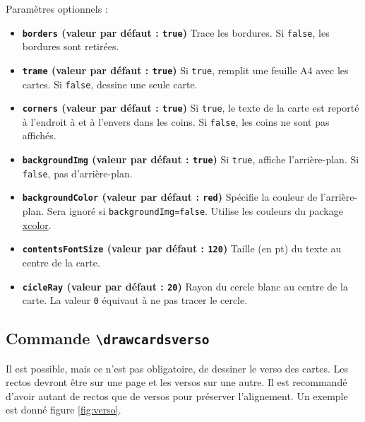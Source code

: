 \documentclass[a4paper, 12pt]{article}
\newcommand{\key}[3]{\textbf{\texttt{#1} (valeur par défaut : \texttt{#2})} #3}
\newcommand{\commande}[1]{\texttt{\textbackslash#1}}
\begin{document}
Paramètres optionnels :
\begin{itemize}
	\item \key{borders}{true}{Trace les bordures. Si \texttt{false}, les bordures sont retirées.}
	\item \key{trame}{true}{Si \texttt{true}, remplit une feuille A4 avec les cartes. Si \texttt{false}, dessine une seule carte.}
	\item \key{corners}{true}{Si \texttt{true}, le texte de la carte est reporté à l'endroit à et à l'envers dans les coins. Si \texttt{false}, les coins ne sont pas affichés.}
	\item \key{backgroundImg}{true}{Si \texttt{true}, affiche l'arrière-plan. Si \texttt{false}, pas d'arrière-plan.}
	\item \key{backgroundColor}{red}{Spécifie la couleur de l'arrière-plan. Sera ignoré si \texttt{backgroundImg=false}. Utilise les couleurs du package \href{https://www.ctan.org/pkg/xcolor}{xcolor}.}
	\item \key{contentsFontSize}{120}{Taille (en pt) du texte au centre de la carte.}
	\item \key{cicleRay}{20}{Rayon du cercle blanc au centre de la carte. La valeur \texttt 0 équivaut à ne pas tracer le cercle.}
\end{itemize}

	\subsection{Commande \commande{drawcardsverso}}
Il est possible, mais ce n'est pas obligatoire, de dessiner le verso des cartes. Les rectos devront être sur une page et les versos sur une autre. Il est recommandé d'avoir autant de rectos que de versos pour préserver l'alignement. Un exemple est donné figure \ref{fig:verso}.
\end{document}
